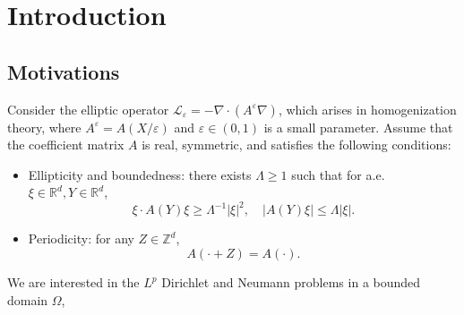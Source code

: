 \documentclass[reqno,12pt]{amsart} %
\theoremstyle{definition}
\theoremstyle{remark}
\numberwithin{equation}{section}
\newcommand{\cL}{\mathcal{L}}
\newcommand{\Z}{\mathbb{Z}}
\newcommand{\R}{\mathbb{R}}
\newcommand{\e}{\varepsilon}
\begin{document}
\section{Introduction}

\subsection{Motivations}
Consider the elliptic operator $\cL_\e = -\nabla\cdot (A^\e\nabla)$,
which arises in homogenization theory, 
where $A^\e=A(X/\e)$ and  $\e \in (0, 1)$ is a small parameter.
Assume that the coefficient matrix $A$ is real, symmetric, and satisfies the following conditions:
\begin{itemize}
    \item Ellipticity and boundedness: there exists $\Lambda \ge 1$ such that for a.e. $\xi \in \R^d, Y\in \R^d$,
    \begin{equation}\label{ellipticity}
       \xi \cdot A(Y)\xi \ge \Lambda^{-1} |\xi|^2, \quad |A(Y) \xi| \le \Lambda |\xi|.
    \end{equation}

    \item Periodicity: for any $Z\in \Z^d$, 
    \begin{equation}\label{periodicity}
        A(\cdot + Z) = A(\cdot).
    \end{equation}
\end{itemize}
We are interested in the $L^p$ Dirichlet and Neumann problems in a bounded domain $\Omega$,
\end{document}
